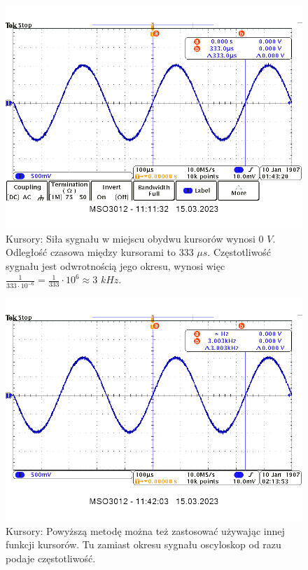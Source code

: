 \documentclass[14pt, table]{extarticle}
\begin{document}
\begin{figure}[H]
\includegraphics[scale=0.7]{A13}
\centering
\captionsetup{labelformat=empty}
\caption{Kursory: Siła sygnału w miejscu obydwu kursorów wynosi $0$ $V$. Odległość czasowa między kursorami to $333$ $\mu s$. Częstotliwość sygnału jest odwrotnością jego okresu, wynosi więc $\frac{1}{333 \cdot 10^{-6}} = \frac{1}{333} \cdot 10^6 \approx 3$ $kHz$.}
\end{figure}

\begin{figure}[H]
\includegraphics[scale=0.65]{A14}
\centering
\captionsetup{labelformat=empty}
\caption{Kursory: Powyższą metodę można też zastosować używając innej funkcji kursorów. Tu zamiast okresu sygnału oscyloskop od razu podaje częstotliwość.}
\end{figure}
\end{document}

